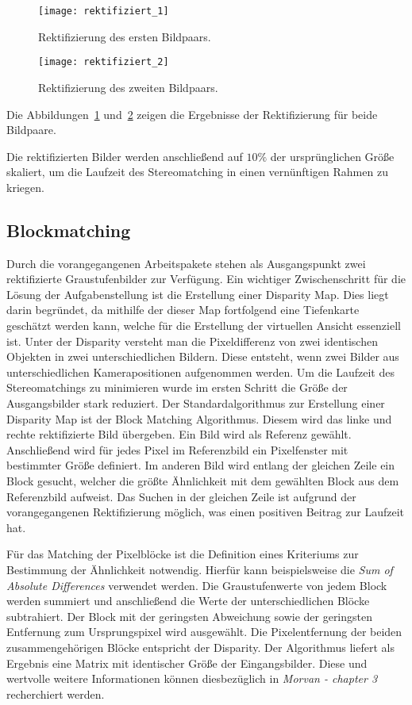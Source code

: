 \begin{figure}[!h]
	\centering
	\texttt{[image: rektifiziert\_1]}
	\caption{Rektifizierung des ersten Bildpaars.}
	\label{fig:rektifizierung_1}
\end{figure}

\begin{figure}[!h]
	\centering
	\texttt{[image: rektifiziert\_2]}
	\caption{Rektifizierung des zweiten Bildpaars.}
	\label{fig:rektifizierung_2}
\end{figure}

Die Abbildungen~\ref{fig:rektifizierung_1} und~\ref{fig:rektifizierung_2} zeigen die Ergebnisse der Rektifizierung für beide Bildpaare.

Die rektifizierten Bilder werden anschließend auf $10 \%$ der ursprünglichen Größe skaliert, um die Laufzeit des Stereomatching in einen vernünftigen Rahmen zu kriegen.

\subsection{Blockmatching}
Durch die vorangegangenen Arbeitspakete stehen als Ausgangspunkt zwei rektifizierte Graustufenbilder zur Verfügung. Ein wichtiger Zwischenschritt für die Lösung der Aufgabenstellung ist die Erstellung einer Disparity Map. Dies liegt darin begründet, da mithilfe der dieser Map fortfolgend eine Tiefenkarte geschätzt werden kann, welche für die Erstellung der virtuellen Ansicht essenziell ist.
Unter der Disparity versteht man die Pixeldifferenz von zwei identischen Objekten in zwei unterschiedlichen Bildern. Diese entsteht, wenn zwei Bilder aus unterschiedlichen Kamerapositionen aufgenommen werden.
Um die Laufzeit des Stereomatchings zu minimieren wurde im ersten Schritt die Größe der Ausgangsbilder stark reduziert.
Der Standardalgorithmus zur Erstellung einer Disparity Map ist der Block Matching Algorithmus.
Diesem wird das linke und rechte rektifizierte Bild übergeben. Ein Bild wird als Referenz gewählt. Anschließend wird für jedes Pixel im Referenzbild ein Pixelfenster mit bestimmter Größe definiert. Im anderen Bild wird entlang der gleichen Zeile ein Block gesucht, welcher die größte Ähnlichkeit mit dem gewählten Block aus dem Referenzbild aufweist. Das Suchen in der gleichen Zeile ist aufgrund der vorangegangenen Rektifizierung möglich, was einen positiven Beitrag zur Laufzeit hat.

Für das Matching der Pixelblöcke ist die Definition eines Kriteriums zur Bestimmung der Ähnlichkeit notwendig.
Hierfür kann beispielsweise die \textit{Sum of Absolute Differences} verwendet werden. Die Graustufenwerte von jedem Block werden summiert und anschließend die Werte der unterschiedlichen Blöcke subtrahiert. Der Block mit der geringsten Abweichung sowie der geringsten Entfernung zum Ursprungspixel wird ausgewählt. Die Pixelentfernung der beiden zusammengehörigen Blöcke entspricht der Disparity. Der Algorithmus liefert als Ergebnis eine Matrix mit identischer Größe der Eingangsbilder.
Diese und wertvolle weitere Informationen können diesbezüglich in \textit{Morvan - chapter 3} \cite{Morvan} recherchiert werden.

